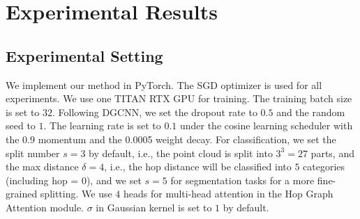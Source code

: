 \documentclass[letterpaper]{article}
\begin{document}
\section{Experimental Results}
\label{sec:results}
\subsection{Experimental Setting}
We implement our method in PyTorch.
The SGD optimizer is used for all experiments.
We use one TITAN RTX GPU for training.
The training batch size is set to $32$.
Following DGCNN, we set the dropout rate to $0.5$ and the random seed to $1$.
The learning rate is set to $0.1$ under the cosine learning scheduler with the $0.9$ momentum and the 0.0005 weight decay.
For classification, we set the split number $s=3$ by default, i.e., the point cloud is split into $3^3=27$ parts, and the max distance $\delta=4$, i.e., the hop distance will be classified into $5$ categories (including hop = $0$), and we set $s=5$ for segmentation tasks for a more fine-grained splitting.
We use $4$ heads for multi-head attention in the Hop Graph Attention module. \(\sigma\) in Gaussian kernel is set to $1$ by default.
\end{document}
